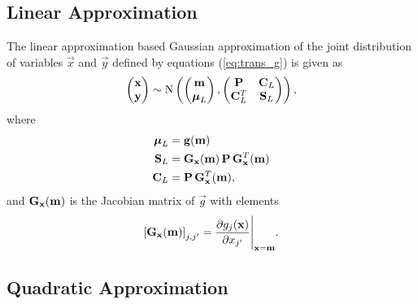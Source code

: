 \subsection{Linear Approximation}

The linear approximation based Gaussian approximation of the joint
distribution of variables $\vec{x}$ and $\vec{y}$ defined by equations
(\ref{eq:trans_g}) is given as
  \begin{equation}
     \begin{pmatrix}
       \mathbf{x} \\ \mathbf{y}
     \end{pmatrix} \sim
     \operatorname{N}\left(
     \begin{pmatrix}
       \mathbf{m} \\ \boldsymbol{\mu}_L
     \end{pmatrix},
     \begin{pmatrix}
       \mathbf{P}   & \mathbf{C}_L \\
       \mathbf{C}_L^T & \mathbf{S}_L
     \end{pmatrix} \right),
  \end{equation}
  where
  \begin{equation}
  \begin{split}
  \boldsymbol{\mu}_L &= \mathbf{g}(\mathbf{m}) \\
    \mathbf{S}_L &= \mathbf{G}_{\mathbf{x}}(\mathbf{m}) \, \mathbf{P} \,
    \mathbf{G}^T_{\mathbf{x}}(\mathbf{m}) \\
    \mathbf{C}_L &= \mathbf{P} \, \mathbf{G}^T_{\mathbf{x}}(\mathbf{m}),
  \end{split}
  \end{equation}
  and $\mathbf{G}_{\mathbf{x}}(\mathbf{m})$ is the Jacobian matrix of $\vec{g}$
  with elements
  \begin{equation}
    \left[ \mathbf{G}_{\mathbf{x}}(\mathbf{m}) \right]_{j,j'} =
    \frac{\partial g_j(\mathbf{x})}{\partial x_{j'}}
    \Bigg|_{\mathbf{x} = \mathbf{m}}.
  \label{eq:G1}
  \end{equation}

\subsection{Quadratic Approximation}

